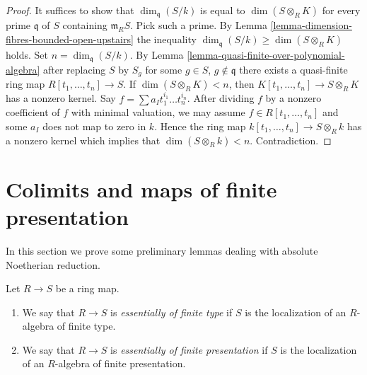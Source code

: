 \begin{proof}
It suffices to show that $\dim_{\mathfrak q}(S/k)$ is equal
to $\dim(S \otimes_R K)$ for every prime $\mathfrak q$ of
$S$ containing $\mathfrak m_RS$. Pick such a prime. By
Lemma \ref{lemma-dimension-fibres-bounded-open-upstairs}
the inequality $\dim_{\mathfrak q}(S/k) \geq \dim(S\otimes_R K)$
holds. Set $n = \dim_{\mathfrak q}(S/k)$. By
Lemma \ref{lemma-quasi-finite-over-polynomial-algebra}
after replacing $S$ by $S_g$ for some $g \in S$, $g \not \in \mathfrak q$
there exists a quasi-finite ring map
$R[t_1, \ldots, t_n] \to S$. If $\dim(S \otimes_R K) < n$,
then $K[t_1, \ldots, t_n] \to S \otimes_R K$ has a nonzero kernel.
Say $f = \sum a_I t_1^{i_1}\ldots t_n^{i_n}$. After dividing
$f$ by a nonzero coefficient of $f$ with minimal valuation, we may
assume $f\in R[t_1, \ldots, t_n]$ and some $a_I$ does not map
to zero in $k$. Hence the ring map $k[t_1, \ldots, t_n] \to S\otimes_R k$
has a nonzero kernel which implies that $\dim(S\otimes_R k) < n$.
Contradiction.
\end{proof}
























\section{Colimits and maps of finite presentation}
\label{section-colimits-flat}

\noindent
In this section we prove some preliminary lemmas
dealing with absolute Noetherian reduction.

\begin{definition}
\label{definition-essentially-finite-p-t}
Let $R \to S$ be a ring map.
\begin{enumerate}
\item We say that $R \to S$ is {\it essentially of finite type} if
$S$ is the localization of an $R$-algebra of finite type.
\item We say that $R \to S$ is {\it essentially of finite presentation} if
$S$ is the localization of an $R$-algebra of finite presentation.
\end{enumerate}
\end{definition}

